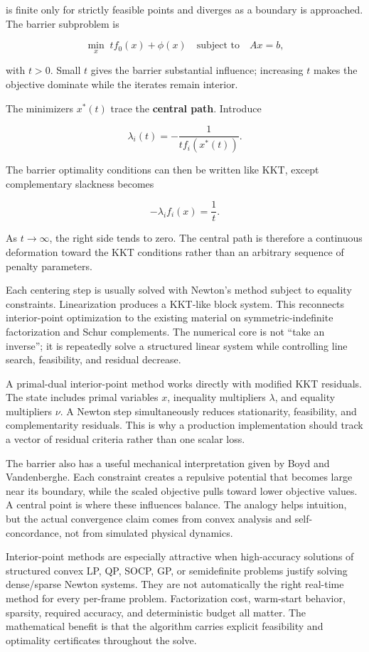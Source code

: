 is finite only for strictly feasible points and diverges as a boundary is approached. The barrier subproblem is

\[
\min_x\;
t f_0(x)+\phi(x)
\quad
\text{subject to}\quad Ax=b,
\]

with \(t>0\). Small \(t\) gives the barrier substantial influence; increasing \(t\) makes the objective dominate while the iterates remain interior.

The minimizers \(x^*(t)\) trace the \textbf{central path}. Introduce

\[
\lambda_i(t)
=
-\frac{1}{t f_i(x^*(t))}.
\]

The barrier optimality conditions can then be written like KKT, except complementary slackness becomes

\[
-\lambda_i f_i(x)=\frac{1}{t}.
\]

As \(t\rightarrow\infty\), the right side tends to zero. The central path is therefore a continuous deformation toward the KKT conditions rather than an arbitrary sequence of penalty parameters.

Each centering step is usually solved with Newton's method subject to equality constraints. Linearization produces a KKT-like block system. This reconnects interior-point optimization to the existing material on symmetric-indefinite factorization and Schur complements. The numerical core is not ``take an inverse''; it is repeatedly solve a structured linear system while controlling line search, feasibility, and residual decrease.

A primal-dual interior-point method works directly with modified KKT residuals. The state includes primal variables \(x\), inequality multipliers \(\lambda\), and equality multipliers \(\nu\). A Newton step simultaneously reduces stationarity, feasibility, and complementarity residuals. This is why a production implementation should track a vector of residual criteria rather than one scalar loss.

The barrier also has a useful mechanical interpretation given by Boyd and Vandenberghe. Each constraint creates a repulsive potential that becomes large near its boundary, while the scaled objective pulls toward lower objective values. A central point is where these influences balance. The analogy helps intuition, but the actual convergence claim comes from convex analysis and self-concordance, not from simulated physical dynamics.

Interior-point methods are especially attractive when high-accuracy solutions of structured convex LP, QP, SOCP, GP, or semidefinite problems justify solving dense/sparse Newton systems. They are not automatically the right real-time method for every per-frame problem. Factorization cost, warm-start behavior, sparsity, required accuracy, and deterministic budget all matter. The mathematical benefit is that the algorithm carries explicit feasibility and optimality certificates throughout the solve.

